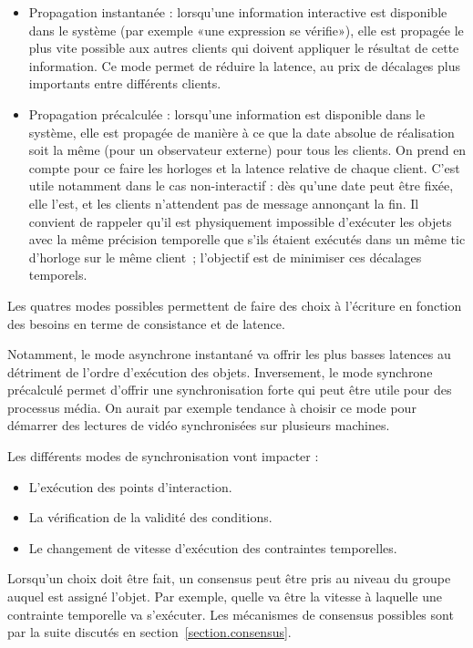 \documentclass{article}
\newcommand\triggers{points d'interaction\xspace}
\begin{document}
\begin{itemize}
	\item Propagation instantanée : lorsqu'une information interactive est disponible dans le système (par exemple «une expression se vérifie»), elle est propagée le plus vite possible aux autres clients qui doivent appliquer le résultat de cette information. 
    Ce mode permet de réduire la latence, au prix de décalages plus importants entre différents clients.
	\item Propagation précalculée : lorsqu'une information est disponible dans le système, elle est propagée de manière à ce que la date absolue de réalisation soit la même (pour un observateur externe) pour tous les clients. 
	On prend en compte pour ce faire les horloges et la latence relative de chaque client.
	C'est utile notamment dans le cas non-interactif : dès qu'une date peut être fixée, elle l'est, et les clients n'attendent pas de message annonçant la fin. 
	Il convient de rappeler qu'il est physiquement impossible d'exécuter les objets avec la même précision temporelle que s'ils étaient exécutés dans un même tic d'horloge sur le même client~; l'objectif est de minimiser ces décalages temporels.
\end{itemize}

Les quatres modes possibles permettent de faire des choix à l'écriture en fonction des besoins en terme de consistance et de latence.

Notamment, le mode asynchrone instantané va offrir les plus basses latences au détriment de l'ordre d'exécution des objets.
Inversement, le mode synchrone précalculé permet d'offrir une synchronisation forte qui peut être utile pour des processus média. 
On aurait par exemple tendance à choisir ce mode pour démarrer des lectures de vidéo synchronisées sur plusieurs machines.

Les différents modes de synchronisation vont impacter : 
\begin{itemize}
    \item L'exécution des \triggers.
    \item La vérification de la validité des conditions.
    \item Le changement de vitesse d'exécution des contraintes temporelles.
\end{itemize}

Lorsqu'un choix doit être fait, un consensus peut être pris au niveau du groupe auquel est assigné l'objet. 
Par exemple, quelle va être la vitesse à laquelle une contrainte temporelle va s'exécuter.
Les mécanismes de consensus possibles sont par la suite discutés en section~\ref{section.consensus}.
\end{document}
